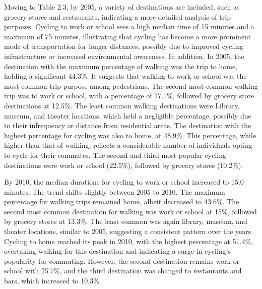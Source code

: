 \documentclass[
11pt, %
oneside, %
english, %
singlespacing, %
]{macthesis} %
\begin{document}
Moving to Table 2.3, by 2005, a variety of destinations are included, such as grocery stores and restaurants, indicating a more detailed analysis of trip purposes. Cycling to work or school sees a high median time of 15 minutes and a maximum of 75 minutes, illustrating that cycling has become a more prominent mode of transportation for longer distances, possibly due to improved cycling infrastructure or increased environmental awareness. In addition, In 2005, the destination with the maximum percentage of walking was the trip to home, holding a significant 44.3\%. It suggests that walking to work or school was the most common trip purpose among pedestrians. The second most common walking trip was to work or school, with a percentage of 17.1\%, followed by grocery store destinations at 12.5\%. The least common walking destinations were Library, museum, and theater locations, which held a negligible percentage, possibly due to their infrequency or distance from residential areas. The destination with the highest percentage for cycling was also to home, at 48.9\%. This percentage, while higher than that of walking, reflects a considerable number of individuals opting to cycle for their commutes. The second and third most popular cycling destinations were work or school (22.5\%), followed by grocery stores (10.2\%).

By 2010, the median durations for cycling to work or school increased to 15.0 minutes. The trend shifts slightly between 2005 to 2010. The maximum percentage for walking trips remained home, albeit decreased to 43.6\%. The second most common destination for walking was work or school at 15\%, followed by grocery stores at 13.3\%. The least common was again library, museum, and theater locations, similar to 2005, suggesting a consistent pattern over the years.
Cycling to home reached its peak in 2010, with the highest percentage at 51.4\%, overtaking walking for this destination and indicating a surge in cycling's popularity for commuting. However, the second destination remains work or school with 25.7\%, and the third destination was changed to restaurants and bars, which increased to 10.3\%.
\end{document}

